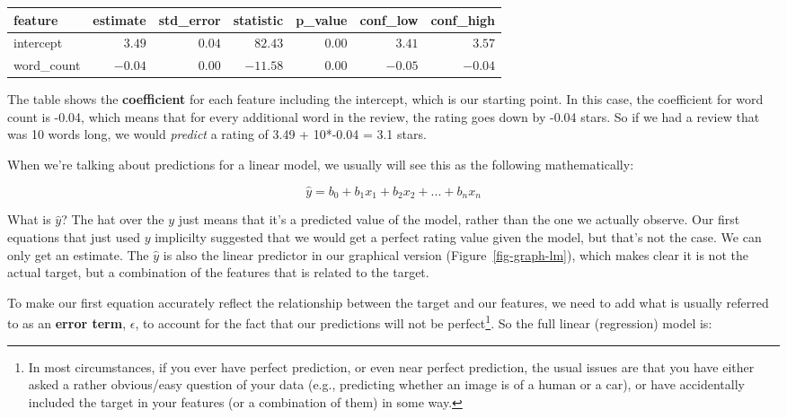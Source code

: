 \documentclass[
  letterpaper,
]{krantz}
\begin{document}
\begin{longtable*}{lrrrrrr}
\toprule
feature & estimate & std\_error & statistic & p\_value & conf\_low & conf\_high \\ 
\midrule\addlinespace[2.5pt]
intercept & \textcolor[HTML]{404040}{$3.49$} & \textcolor[HTML]{404040}{$0.04$} & \textcolor[HTML]{404040}{$82.43$} & \textcolor[HTML]{404040}{$0.00$} & \textcolor[HTML]{404040}{$3.41$} & \textcolor[HTML]{404040}{$3.57$} \\ 
word\_count & \textcolor[HTML]{404040}{$-0.04$} & \textcolor[HTML]{404040}{$0.00$} & \textcolor[HTML]{404040}{$-11.58$} & \textcolor[HTML]{404040}{$0.00$} & \textcolor[HTML]{404040}{$-0.05$} & \textcolor[HTML]{404040}{$-0.04$} \\ 
\bottomrule
\end{longtable*}

\normalsize

The table shows the \textbf{coefficient} for each feature including the
intercept, which is our starting point. In this case, the coefficient
for word count is -0.04, which means that for every additional word in
the review, the rating goes down by -0.04 stars. So if we had a review
that was 10 words long, we would \emph{predict} a rating of 3.49 +
10*-0.04 = 3.1 stars.

When we're talking about predictions for a linear model, we usually will
see this as the following mathematically:

\[
\hat{y} = b_0 + b_1x_1 + b_2x_2 + ... + b_nx_n
\]

What is \(\hat{y}\)? The hat over the \(y\) just means that it's a
predicted value of the model, rather than the one we actually observe.
Our first equations that just used \(y\) implicilty suggested that we
would get a perfect rating value given the model, but that's not the
case. We can only get an estimate. The \(\hat{y}\) is also the linear
predictor in our graphical version (Figure~\ref{fig-graph-lm}), which
makes clear it is not the actual target, but a combination of the
features that is related to the target.

To make our first equation accurately reflect the relationship between
the target and our features, we need to add what is usually referred to
as an \textbf{error term}, \(\epsilon\), to account for the fact that
our predictions will not be perfect\footnote{In most circumstances, if
  you ever have perfect prediction, or even near perfect prediction, the
  usual issues are that you have either asked a rather obvious/easy
  question of your data (e.g., predicting whether an image is of a human
  or a car), or have accidentally included the target in your features
  (or a combination of them) in some way.}. So the full linear
(regression) model is:
\end{document}
